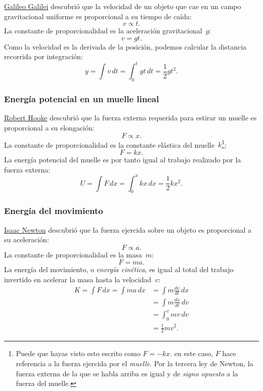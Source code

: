 \href{https://es.wikipedia.org/wiki/Galileo_Galilei}{Galileo Galilei} descubrió que la velocidad de un objeto que cae en un campo gravitacional uniforme es proporcional a su tiempo de caída:
\[ v \propto t. \]
La constante de proporcionalidad es la aceleración gravitacional~$g$:
\[ v = g t. \]
Como la velocidad es la derivada de la posición, podemos calcular la distancia recorrida por integración:
\[ y = \int v\,dt = \int_0^t gt\,dt = \textstyle{\frac{1}{2}} gt^2. \]


    \subsubsection{Energía potencial en un muelle lineal} %
    \label{sec:potential_energy_in_a_linear_spring}

\href{https://es.wikipedia.org/wiki/Robert_Hooke}{Robert Hooke} descubrió que la fuerza externa requerida para estirar un muelle es proporcional a su elongación:
\[ F \propto x. \]
La constante de proporcionalidad es la constante elástica del muelle~$k$\footnote{Puede que hayas visto esto escrito como $F = -kx$. en este caso, $F$ hace referencia a la fuerza ejercida por el \emph{muelle}. Por la tercera ley de Newton, la fuerza externa de la que se habla arriba es igual y de \emph{signo opuesto} a la fuerza del muelle.}:
\[ F = k x. \]
La energía potencial del muelle es por tanto igual al trabajo realizado por la fuerza externa:
\[ U = \int F\,dx = \int_0^x kx\,dx = \textstyle{\frac{1}{2}} kx^2. \]

    \subsubsection{Energía del movimiento} %
    \label{sec:energy_of_motion}

\href{https://es.wikipedia.org/wiki/Isaac_Newton}{Isaac Newton} descubrió que la fuerza ejercida sobre un objeto es proporcional a su aceleración:
\[ F \propto a. \]
La constante de proporcionalidad es la masa~$m$:
\[ F = m a. \]
La energía del movimiento, o \emph{energía cinética}, es igual al total del trabajo invertido en acelerar la masa hasta la velocidad~$v$:
\[
\begin{split}
K = \int F\,dx = \int ma\,dx & = \int m\frac{dv}{dt}\,dx \\ & = \int m\frac{dx}{dt}\,dv \\ & = \int_0^v mv\,dv \\ & = \textstyle{\frac{1}{2}} mv^2.
\end{split}
\]

